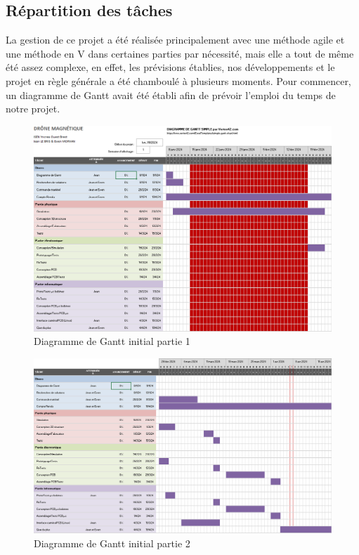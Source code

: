 \documentclass{article}
\begin{document}
    \subsection{Répartition des tâches}
        La gestion de ce projet a été réalisée principalement avec une méthode agile et une méthode en V dans certaines parties par nécessité, mais elle a tout de même été assez complexe, en effet, les prévisions établies, nos développements et le projet en règle générale a été chamboulé à plusieurs moments. Pour commencer, un diagramme de Gantt avait été établi afin de prévoir l'emploi du temps de notre projet.
    
        \begin{figure}[H]
        \centering
            \includegraphics[width = 1\textwidth]{Images/Gantt1.png}
            \caption{Diagramme de Gantt initial partie 1}
            \label{fig:Gantt-1}
        \end{figure}

        \begin{figure}[H]
        \centering
            \includegraphics[width = 1\textwidth]{Images/Gantt2.png}
            \caption{Diagramme de Gantt initial partie 2}
            \label{fig:Gantt-2}
        \end{figure}
        
\end{document}
